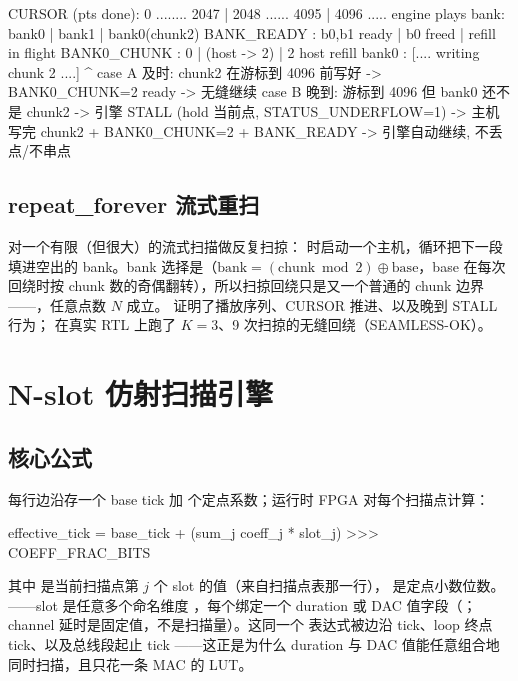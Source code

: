 \documentclass[11pt,oneside,openany]{book}
\begin{document}
\begin{codeblock}
CURSOR (pts done):  0 ........ 2047 | 2048 ...... 4095 | 4096 .....
engine plays bank:  bank0          | bank1           | bank0(chunk2)
BANK_READY        :  b0,b1 ready    | b0 freed        | refill in flight
BANK0_CHUNK       :  0              | (host -> 2)     | 2
host refill bank0 :       [.... writing chunk 2 ....]
                                          ^
case A 及时:  chunk2 在游标到 4096 前写好 -> BANK0_CHUNK=2 ready -> 无缝继续
case B 晚到:  游标到 4096 但 bank0 还不是 chunk2
              -> 引擎 STALL (hold 当前点, STATUS_UNDERFLOW=1)
              -> 主机写完 chunk2 + BANK0_CHUNK=2 + BANK_READY
              -> 引擎自动继续, 不丢点/不串点
\end{codeblock}

\section{repeat\_forever 流式重扫}
 对一个有限（但很大）的流式扫描做反复扫掠： 时启动一个主机，循环把下一段填进空出的 bank。bank 选择是（$\text{bank}=(\text{chunk}\bmod 2)\oplus\text{base}$，base 在每次回绕时按 chunk 数的奇偶翻转），所以扫掠回绕只是又一个普通的 chunk 边界——，任意点数 $N$ 成立。 证明了播放序列、CURSOR 推进、以及晚到 STALL 行为； 在真实 RTL 上跑了 $K=3$、9 次扫掠的无缝回绕（SEAMLESS-OK）。

\chapter{N-slot 仿射扫描引擎}

\section{核心公式}
每行边沿存一个 base tick 加  个定点系数；运行时 FPGA 对每个扫描点计算：

\begin{codeblock}
effective_tick = base_tick + (sum_j coeff_j * slot_j) >>> COEFF_FRAC_BITS
\end{codeblock}

其中  是当前扫描点第 $j$ 个 slot 的值（来自扫描点表那一行）， 是定点小数位数。——slot 是任意多个命名维度 ，每个绑定一个 duration 或 DAC 值字段（；channel 延时是固定值，不是扫描量）。这同一个  表达式被边沿 tick、loop 终点 tick、以及总线段起止 tick ——这正是为什么 duration 与 DAC 值能任意组合地同时扫描，且只花一条 MAC 的 LUT。
\end{document}

